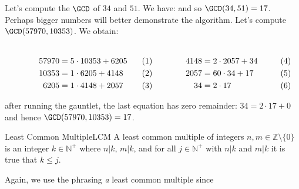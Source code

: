 \documentclass{article}                                                        %
\begin{document}
            \begin{example}
                Let's compute the $\GCD$ of $34$ and $51$. We have:
                and so $\GCD(34,51)=17$. Perhaps bigger numbers will better
                demonstrate the algorithm. Let's compute $\GCD(57970,10353)$. We
                obtain:
                \par
                \begin{subequations}
                    \begin{minipage}[b]{0.49\textwidth}
                        \centering
                        \begin{align}
                            57970&=5\cdot{10353}+6205\\
                            10353&=1\cdot{6205}+4148\\
                            6205&=1\cdot{4148}+2057
                        \end{align}
                    \end{minipage}
                    \hfill
                    \begin{minipage}[b]{0.49\textwidth}
                        \centering
                        \begin{align}
                            4148&=2\cdot{2057}+34\\
                            2057&=60\cdot{34}+17\\
                            34&=2\cdot{17}
                        \end{align}
                    \end{minipage}
                \end{subequations}
                \par\vspace{2.5ex}
                after running the gauntlet, the last equation has zero
                remainder: $34=2\cdot{17}+0$ and hence $\GCD(57970,10353)=17$.
            \end{example}
            \begin{fdefinition}{Least Common Multiple}{LCM}
                A least common multiple of integers
                $n,m\in\mathbb{Z}\setminus\{0\}$ is an integer
                $k\in\mathbb{N}^{+}$ where $n|k$, $m|k$, and for all
                $j\in\mathbb{N}^{+}$ with $n|k$ and $m|k$ it is true that
                $k\leq{j}$.
            \end{fdefinition}
            Again, we use the phrasing \textit{a} least common multiple since
\end{document}
